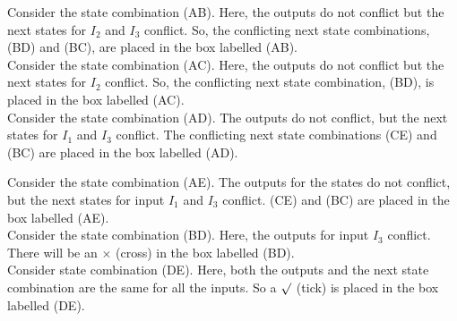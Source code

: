 \documentclass[9pt]{beamer}
\begin{document}
\begin{frame}
\hspace*{0.5cm} Consider the state combination (AB). Here, the outputs do not conflict but the next states for $I_2$ and $I_3$
conflict. So, the conflicting next state combinations, (BD) and (BC), are placed in the box labelled (AB).\\
\hspace*{0.5cm} Consider the state combination (AC). Here, the outputs do not conflict but the next states for $I_2$ conflict. So, the conflicting next state combination, (BD), is placed in the box labelled (AC).\\
\hspace*{0.5cm} Consider the state combination (AD). The outputs do not conflict, but the next states for $I_1$ and $I_3$
conflict. The conflicting next state combinations (CE) and (BC) are placed in the box labelled (AD).\\

\end{frame}

\begin{frame}
\hspace*{0.5cm} Consider the state combination (AE). The outputs for the states do not conflict, but the next states for
input $I_1$ and $I_3$ conflict. (CE) and (BC) are placed in the box labelled (AE).\\
\hspace*{0.5cm} Consider the state combination (BD). Here, the outputs for input $I_3$ conflict. There will be an $\times$ (cross)
in the box labelled (BD).\\
\hspace*{0.5cm} Consider state combination (DE). Here, both the outputs and the next state combination are the same
for all the inputs. So a $ \surd$ (tick) is placed in the box labelled (DE).\\
\end{frame}
\end{document}
